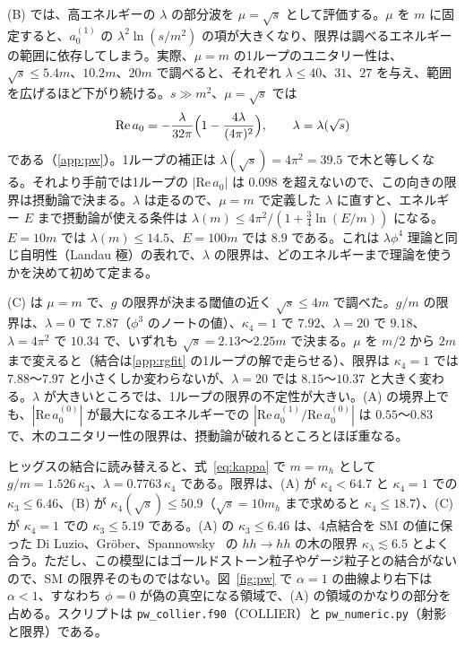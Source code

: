 \documentclass[a4paper,10pt]{ltjsarticle}
\begin{document}
(B) では、高エネルギーの $\lambda$ の部分波を $\mu=\sqrt s$ として評価する。$\mu$ を $m$ に固定すると、$a_0^{(1)}$ の $\lambda^2\ln(s/m^2)$ の項が大きくなり、限界は調べるエネルギーの範囲に依存してしまう。実際、$\mu=m$ の1ループのユニタリー性は、$\sqrt s\le5.4m$、$10.2m$、$20m$ で調べると、それぞれ $\lambda\le40$、$31$、$27$ を与え、範囲を広げるほど下がり続ける。$s\gg m^2$、$\mu=\sqrt s$ では
\begin{equation*}
\mathrm{Re}\,a_0=-\frac{\lambda}{32\pi}\Bigl(1-\frac{4\lambda}{(4\pi)^2}\Bigr),\qquad\lambda=\lambda(\sqrt s)
\end{equation*}
である（\ref{app:pw}）。1ループの補正は $\lambda(\sqrt s)=4\pi^2=39.5$ で木と等しくなる。それより手前では1ループの $|\mathrm{Re}\,a_0|$ は $0.098$ を超えないので、この向きの限界は摂動論で決まる。$\lambda$ は走るので、$\mu=m$ で定義した $\lambda$ に直すと、エネルギー $E$ まで摂動論が使える条件は $\lambda(m)\le4\pi^2/(1+\frac34\ln(E/m))$ になる。$E=10m$ では $\lambda(m)\le14.5$、$E=100m$ では $8.9$ である。これは $\lambda\phi^4$ 理論と同じ自明性（Landau 極）の表れで、$\lambda$ の限界は、どのエネルギーまで理論を使うかを決めて初めて定まる。

(C) は $\mu=m$ で、$g$ の限界が決まる閾値の近く $\sqrt s\le4m$ で調べた。$g/m$ の限界は、$\lambda=0$ で $7.87$（$\phi^3$ のノートの値）、$\kappa_4=1$ で $7.92$、$\lambda=20$ で $9.18$、$\lambda=4\pi^2$ で $10.34$ で、いずれも $\sqrt s=2.13$〜$2.25m$ で決まる。$\mu$ を $m/2$ から $2m$ まで変えると（結合は\ref{app:rgfit} の1ループの解で走らせる）、限界は $\kappa_4=1$ では $7.88$〜$7.97$ と小さくしか変わらないが、$\lambda=20$ では $8.15$〜$10.37$ と大きく変わる。$\lambda$ が大きいところでは、1ループの限界の不定性が大きい。(A) の境界上でも、$|\mathrm{Re}\,a_0^{(0)}|$ が最大になるエネルギーでの $|\mathrm{Re}\,a_0^{(1)}/\mathrm{Re}\,a_0^{(0)}|$ は $0.55$〜$0.83$ で、木のユニタリー性の限界は、摂動論が破れるところとほぼ重なる。

ヒッグスの結合に読み替えると、式~\eqref{eq:kappa} で $m=m_h$ として $g/m=1.526\,\kappa_3$、$\lambda=0.7763\,\kappa_4$ である。限界は、(A) が $\kappa_4<64.7$ と $\kappa_4=1$ での $\kappa_3\le6.46$、(B) が $\kappa_4(\sqrt s)\le50.9$（$\sqrt s=10m_h$ まで求めると $\kappa_4\le18.7$）、(C) が $\kappa_4=1$ での $\kappa_3\le5.19$ である。(A) の $\kappa_3\le6.46$ は、4点結合を SM の値に保った Di Luzio、Gröber、Spannowsky~\cite{dgs} の $hh\to hh$ の木の限界 $\kappa_\lambda\lesssim6.5$ とよく合う。ただし、この模型にはゴールドストーン粒子やゲージ粒子との結合がないので、SM の限界そのものではない。図~\ref{fig:pw} で $\alpha=1$ の曲線より右下は $\alpha<1$、すなわち $\phi=0$ が偽の真空になる領域で、(A) の領域のかなりの部分を占める。スクリプトは \texttt{pw\_collier.f90}（COLLIER）と \texttt{pw\_numeric.py}（射影と限界）である。
\end{document}
